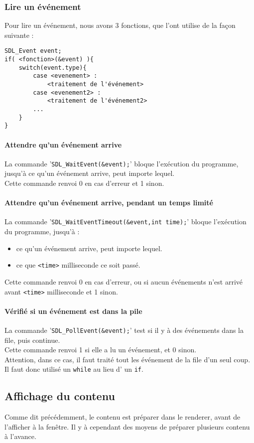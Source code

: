 \documentclass[ 10pt , a4paper ]{Document}
\begin{document}
\begin{Document}
		\subsubsection{Lire un événement}
		Pour lire un événement, nous avons 3 fonctions, que l'ont utilise de la façon suivante :
\begin{lstlisting}[name="Lire un événement"]
SDL_Event event;
if( <fonction>(&event) ){
	switch(event.type){
		case <evenement> :
			<traitement de l'événement>
		case <evenement2> :
			<traitement de l'événement2>
		...
	}
}
\end{lstlisting}
		\paragraph{Attendre qu'un événement arrive}
			La commande '\lstinline!SDL_WaitEvent(&event);!' bloque l’exécution du programme,
			jusqu'à ce qu'un événement arrive, peut importe lequel.\\
			Cette commande renvoi 0 en cas d'erreur et 1 sinon.
		\paragraph{Attendre qu'un événement arrive, pendant un temps limité}
			La commande '\lstinline!SDL_WaitEventTimeout(&event,int time);!' bloque l’exécution du programme,
			jusqu'à :
			\begin{itemize}
				\item ce qu'un événement arrive, peut importe lequel.
				\item ce que \lstinline!<time>! milliseconde ce soit passé.
			\end{itemize}
			Cette commande renvoi 0 en cas d'erreur, ou si aucun événements n'est arrivé avant \lstinline!<time>! milliseconde et 1 sinon.
		\paragraph{Vérifié si un événement est dans la pile}
			La commande '\lstinline!SDL_PollEvent(&event);!' test si il y à des événements dans la file, puis continue.\\
			Cette commande renvoi 1 si elle a lu un événement, et 0 sinon.\\
			Attention, dans ce cas, il faut traité tout les événement de la file d'un seul coup.
			Il faut donc utilisé un \lstinline!while! au lieu d' un \lstinline!if!.
	\subsection{Affichage du contenu}
		Comme dit précédemment, le contenu est préparer dans le renderer, avant de l'afficher à la fenêtre.
		Il y à cependant des moyens de préparer plusieurs contenu à l'avance.

\end{Document}
\end{document}
